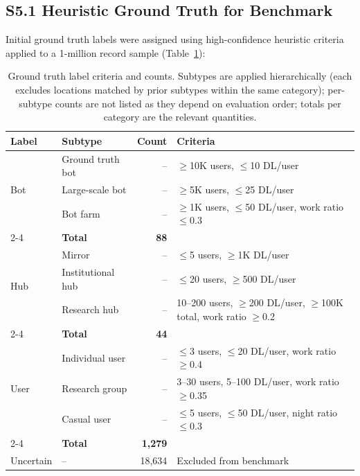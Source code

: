 \documentclass[11pt,a4paper]{article}
\begin{document}
\subsection{S5.1 Heuristic Ground Truth for Benchmark}

Initial ground truth labels were assigned using high-confidence heuristic criteria applied to a 1-million record sample (Table~\ref{tab:ground_truth}):

\begin{table}[H]
\centering
\caption{Ground truth label criteria and counts. Subtypes are applied hierarchically (each excludes locations matched by prior subtypes within the same category); per-subtype counts are not listed as they depend on evaluation order; totals per category are the relevant quantities.}
\label{tab:ground_truth}
\small
\begin{tabular}{llrp{6cm}}
\toprule
\textbf{Label} & \textbf{Subtype} & \textbf{Count} & \textbf{Criteria} \\
\midrule
\multirow{3}{*}{Bot} & Ground truth bot & -- & $\geq$10K users, $\leq$10 DL/user \\
& Large-scale bot & -- & $\geq$5K users, $\leq$25 DL/user \\
& Bot farm & -- & $\geq$1K users, $\leq$50 DL/user, work ratio $\leq$0.3 \\
\cmidrule{2-4}
& \textbf{Total} & \textbf{88} & \\
\midrule
\multirow{3}{*}{Hub} & Mirror & -- & $\leq$5 users, $\geq$1K DL/user \\
& Institutional hub & -- & $\leq$20 users, $\geq$500 DL/user \\
& Research hub & -- & 10--200 users, $\geq$200 DL/user, $\geq$100K total, work ratio $\geq$0.2 \\
\cmidrule{2-4}
& \textbf{Total} & \textbf{44} & \\
\midrule
\multirow{3}{*}{User} & Individual user & -- & $\leq$3 users, $\leq$20 DL/user, work ratio $\geq$0.4 \\
& Research group & -- & 3--30 users, 5--100 DL/user, work ratio $\geq$0.35 \\
& Casual user & -- & $\leq$5 users, $\leq$50 DL/user, night ratio $\leq$0.3 \\
\cmidrule{2-4}
& \textbf{Total} & \textbf{1,279} & \\
\midrule
Uncertain & -- & 18,634 & Excluded from benchmark \\
\bottomrule
\end{tabular}
\end{table}
\end{document}
